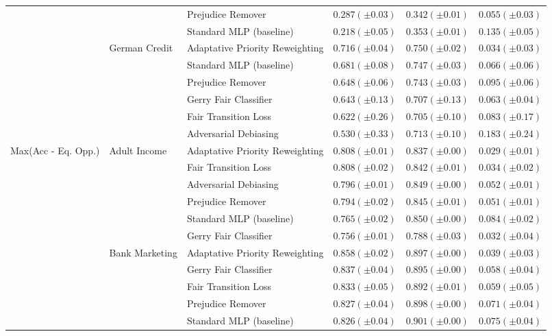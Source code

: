 \begin{tabular}{llllll}
 &  & Prejudice Remover & $0.287 (\pm0.03)$ & $0.342 (\pm0.01)$ & $0.055 (\pm0.03)$ \\
 &  & Standard MLP (baseline) & $0.218 (\pm0.05)$ & $0.353 (\pm0.01)$ & $0.135 (\pm0.05)$ \\
\cline{2-6}
 & \multirow[t]{6}{*}{German Credit} & Adaptative Priority Reweighting & $0.716 (\pm0.04)$ & $0.750 (\pm0.02)$ & $0.034 (\pm0.03)$ \\
 &  & Standard MLP (baseline) & $0.681 (\pm0.08)$ & $0.747 (\pm0.03)$ & $0.066 (\pm0.06)$ \\
 &  & Prejudice Remover & $0.648 (\pm0.06)$ & $0.743 (\pm0.03)$ & $0.095 (\pm0.06)$ \\
 &  & Gerry Fair Classifier & $0.643 (\pm0.13)$ & $0.707 (\pm0.13)$ & $0.063 (\pm0.04)$ \\
 &  & Fair Transition Loss & $0.622 (\pm0.26)$ & $0.705 (\pm0.10)$ & $0.083 (\pm0.17)$ \\
 &  & Adversarial Debiasing & $0.530 (\pm0.33)$ & $0.713 (\pm0.10)$ & $0.183 (\pm0.24)$ \\
\cline{1-6} \cline{2-6}
\multirow[t]{24}{*}{Max(Acc - Eq. Opp.)} & \multirow[t]{6}{*}{Adult Income} & Adaptative Priority Reweighting & $0.808 (\pm0.01)$ & $0.837 (\pm0.00)$ & $0.029 (\pm0.01)$ \\
 &  & Fair Transition Loss & $0.808 (\pm0.02)$ & $0.842 (\pm0.01)$ & $0.034 (\pm0.02)$ \\
 &  & Adversarial Debiasing & $0.796 (\pm0.01)$ & $0.849 (\pm0.00)$ & $0.052 (\pm0.01)$ \\
 &  & Prejudice Remover & $0.794 (\pm0.02)$ & $0.845 (\pm0.01)$ & $0.051 (\pm0.01)$ \\
 &  & Standard MLP (baseline) & $0.765 (\pm0.02)$ & $0.850 (\pm0.00)$ & $0.084 (\pm0.02)$ \\
 &  & Gerry Fair Classifier & $0.756 (\pm0.01)$ & $0.788 (\pm0.03)$ & $0.032 (\pm0.04)$ \\
\cline{2-6}
 & \multirow[t]{6}{*}{Bank Marketing} & Adaptative Priority Reweighting & $0.858 (\pm0.02)$ & $0.897 (\pm0.00)$ & $0.039 (\pm0.03)$ \\
 &  & Gerry Fair Classifier & $0.837 (\pm0.04)$ & $0.895 (\pm0.00)$ & $0.058 (\pm0.04)$ \\
 &  & Fair Transition Loss & $0.833 (\pm0.05)$ & $0.892 (\pm0.01)$ & $0.059 (\pm0.05)$ \\
 &  & Prejudice Remover & $0.827 (\pm0.04)$ & $0.898 (\pm0.00)$ & $0.071 (\pm0.04)$ \\
 &  & Standard MLP (baseline) & $0.826 (\pm0.04)$ & $0.901 (\pm0.00)$ & $0.075 (\pm0.04)$ \\

\end{tabular}
